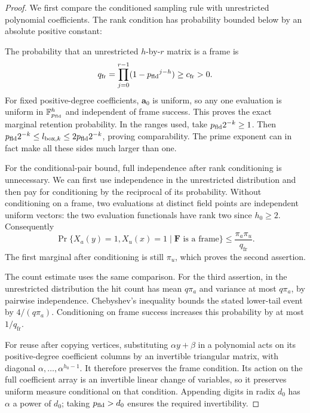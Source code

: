 \documentclass[11pt]{article}
\numberwithin{equation}{section}
\theoremstyle{definition}
\theoremstyle{remark}
\begin{document}
\begin{proof}
We first compare the conditioned sampling rule with unrestricted polynomial coefficients. The rank condition has probability bounded below by an absolute positive constant:
\par
The probability that an unrestricted ${h}$-by-$r$ matrix is a frame is
\[
q_{\mathrm{fr}}=\prod_{j=0}^{r-1}(1-{p_{\rm fld}}^{j-{h}})\ge c_{\mathrm{fr}}>0.
\]
For fixed positive-degree coefficients, ${\mathbf{a}}_0$ is uniform, so any one
evaluation is uniform in $\mathbb F_{p_{\rm fld}}^{h}$ and independent of frame
success. This proves the exact marginal retention probability.
In the ranges used, take ${p_{\rm fld}}2^{-k}\ge1$. Then
${p_{\rm fld}}2^{-k}\le {l_{\mathrm{box},k}}\le2{p_{\rm fld}}2^{-k}$, proving comparability. The prime
exponent can in fact make all these sides much larger than one.

For the conditional-pair bound, full independence after rank conditioning is unnecessary. We can first use independence in the unrestricted distribution and then pay for conditioning by the reciprocal of its probability. Without conditioning on a frame, two evaluations at distinct field
points are independent uniform vectors: the two evaluation functionals
have rank two since $h_0\ge2$. Consequently
\[
\Pr\{X_a(y)=1,X_u(x)=1\mid {\mathbf{F}}\text{ is a frame}\}
\le \frac{\pi_a\pi_u}{q_{\mathrm{fr}}}.
\]
The first marginal after conditioning is still $\pi_u$, which proves
the second assertion.

The count estimate uses the same comparison. For the third assertion, in the unrestricted distribution the hit count
has mean $q\pi_a$ and variance at most $q\pi_a$, by pairwise
independence. Chebyshev's inequality bounds the stated lower-tail event
by $4/(q\pi_a)$. Conditioning on frame success increases this probability
by at most $1/q_{\mathrm{fr}}$.

For reuse after copying vertices, substituting $\alpha y+\beta$ in a polynomial acts on its
positive-degree coefficient columns by an invertible triangular
matrix, with diagonal $\alpha,\ldots,\alpha^{h_0-1}$.
It therefore preserves the frame condition. Its action on the full
coefficient array is an invertible linear change of variables, so it
preserves uniform measure conditional on that condition. Appending
digits in radix ${d}_0$ has $\alpha$ a power of ${d}_0$; taking
${p_{\rm fld}}>{d}_0$ ensures the required invertibility.
\end{proof}
\end{document}
